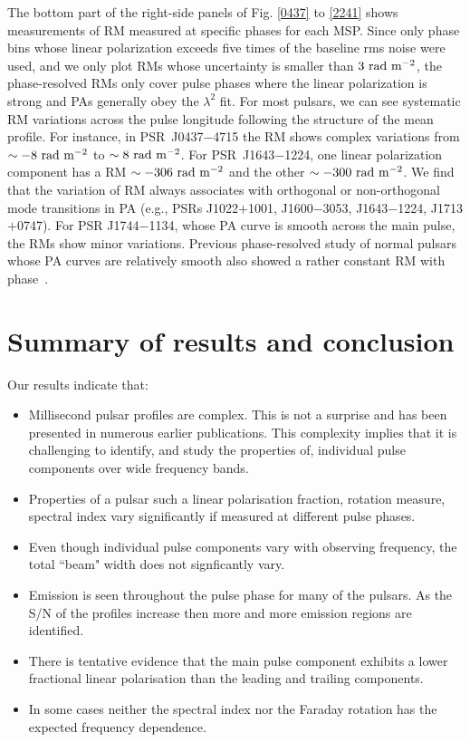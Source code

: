 \documentclass[useAMS,usenatbib]{mn2e}
\begin{document}

The bottom part of the right-side panels of Fig. \ref{0437} to \ref{2241} shows measurements of RM measured at specific phases for each MSP.
%
Since only phase bins whose linear polarization exceeds five times of the baseline 
rms noise were used, and we only plot RMs whose uncertainty is smaller than $3\ \rm{rad\ m^{-2}}$,
the phase-resolved RMs only cover pulse phases where the linear polarization is 
strong and PAs generally obey the $\lambda^2$ fit.
%
For most pulsars, we can see systematic RM variations across the pulse longitude following the 
structure of the mean profile.
%
For instance, in PSR~J0437$-$4715 the RM shows complex variations from $\sim -8\ \rm{rad\ m^{-2}}$ 
to $\sim 8\ \rm{rad\ m^{-2}}$. For PSR~J1643$-$1224, one linear polarization component has 
a RM $\sim -306\ \rm{rad\ m^{-2}}$ and the other $\sim -300\ \rm{rad\ m^{-2}}$. 
%
We find that the variation of RM always associates with orthogonal or non-orthogonal mode 
transitions in PA (e.g., PSRs J1022$+$1001, J1600$-$3053, J1643$-$1224, J1713$+$0747).
%
For PSR J1744$-$1134, whose PA curve is smooth across the main pulse, the RMs show minor 
variations.
%
Previous phase-resolved study of normal pulsars whose PA curves are relatively smooth also 
showed a rather constant RM with phase~\citep{Noutsos09}.

\section{Summary of results and conclusion}

Our results indicate that:
\begin{itemize}
\item Millisecond pulsar profiles are complex. This is not a surprise and has been presented 
	in numerous earlier publications. This complexity implies that it is challenging to identify, 
	and study the properties of, individual pulse components over wide frequency bands.
\item Properties of a pulsar such a linear polarisation fraction, rotation measure, spectral index 
	vary significantly if measured at different pulse phases.
\item Even though individual pulse components vary with observing frequency, the total ``beam" width does not signficantly vary.
\item Emission is seen throughout the pulse phase for many of the pulsars. As the S/N of the profiles 
	increase then more and more emission regions are identified.
\item There is tentative evidence that the main pulse component exhibits a lower fractional 
	linear polarisation than the leading and trailing components.
\item In some cases neither the spectral index nor the Faraday rotation has the expected frequency dependence.
\end{itemize}
\end{document}
